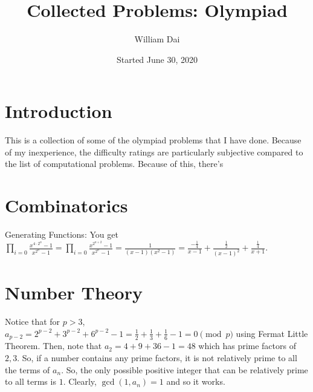 \documentclass[11pt]{article}
\title{Collected Problems: Olympiad}
\author{William Dai}
\date{Started June 30, 2020}
\begin{document}
\maketitle

\section{Introduction}
This is a collection of some of the olympiad problems that I have done. Because of my inexperience, the difficulty ratings are particularly subjective compared to the list of computational problems. Because of this, there\rq{s}
\section{Combinatorics}

\begin{sol} Generating Functions: You get $\prod_{i=0} \frac{x^{4\cdot 2^{n}}-1}{x^{2^n}-1}= \prod_{i=0} \frac{x^{2^{n+2}}-1}{x^{2^n}-1}=\frac{1}{(x-1)(x^2-1)}=\frac{-\frac{1}{4}}{x-1}+\frac{\frac{1}{2}}{(x-1)^2}+\frac{\frac{1}{4}}{x+1}.$
\end{sol}


\setcounter{problem}{0}
\section{Number Theory}

\begin{sol}
Notice that for $p>3$, $a_{p-2}=2^{p-2}+3^{p-2}+6^{p-2}-1=\frac{1}{2}+\frac{1}{3}+\frac{1}{6}-1=0\pmod{p}$ using Fermat Little Theorem. Then, note that $a_{2}=4+9+36-1=48$ which has prime factors of $2,3$. So, if a number contains any prime factors, it is not relatively prime to all the terms of $a_{n}$. So, the only possible positive integer that can be relatively prime to all terms is $\boxed{1}$. Clearly, $\gcd(1,a_{n})=1$ and so it works.
\end{sol}

\end{document}
